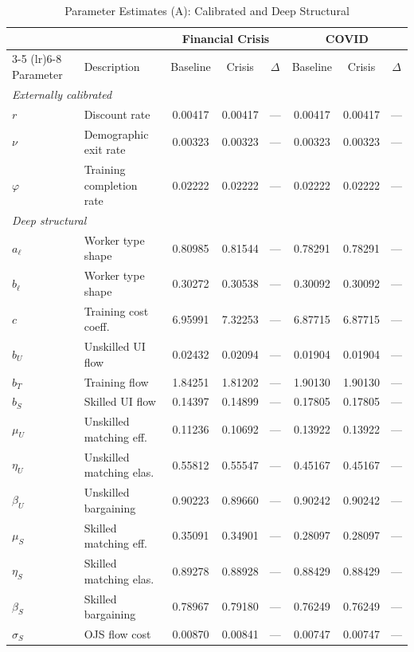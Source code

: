 \begin{table}[htbp]
  \centering
  \caption{Parameter Estimates (A): Calibrated and Deep Structural}
  \label{tab:param_estimates_a}
  \small
  \begin{tabular}{llcccccc}
    \toprule
    & & \multicolumn{3}{c}{Financial Crisis} & \multicolumn{3}{c}{COVID} \\
    \cmidrule(lr){3-5} \cmidrule(lr){6-8}
    Parameter & Description & Baseline & Crisis & $\Delta$ & Baseline & Crisis & $\Delta$ \\
    \midrule
    \multicolumn{8}{l}{\textit{Externally calibrated}} \\[2pt]
    \quad $r$ & Discount rate & 0.00417 & 0.00417 & --- & 0.00417 & 0.00417 & --- \\
    \quad $\nu$ & Demographic exit rate & 0.00323 & 0.00323 & --- & 0.00323 & 0.00323 & --- \\
    \quad $\varphi$ & Training completion rate & 0.02222 & 0.02222 & --- & 0.02222 & 0.02222 & --- \\
    [4pt]
    \hline
    \multicolumn{8}{l}{\textit{Deep structural}} \\[2pt]
    \quad $a_\ell$ & Worker type shape & 0.80985 & 0.81544 & --- & 0.78291 & 0.78291 & --- \\
    \quad $b_\ell$ & Worker type shape & 0.30272 & 0.30538 & --- & 0.30092 & 0.30092 & --- \\
    \quad $c$ & Training cost coeff. & 6.95991 & 7.32253 & --- & 6.87715 & 6.87715 & --- \\
    \quad $b_U$ & Unskilled UI flow & 0.02432 & 0.02094 & --- & 0.01904 & 0.01904 & --- \\
    \quad $b_T$ & Training flow & 1.84251 & 1.81202 & --- & 1.90130 & 1.90130 & --- \\
    \quad $b_S$ & Skilled UI flow & 0.14397 & 0.14899 & --- & 0.17805 & 0.17805 & --- \\
    \quad $\mu_U$ & Unskilled matching eff. & 0.11236 & 0.10692 & --- & 0.13922 & 0.13922 & --- \\
    \quad $\eta_U$ & Unskilled matching elas. & 0.55812 & 0.55547 & --- & 0.45167 & 0.45167 & --- \\
    \quad $\beta_U$ & Unskilled bargaining & 0.90223 & 0.89660 & --- & 0.90242 & 0.90242 & --- \\
    \quad $\mu_S$ & Skilled matching eff. & 0.35091 & 0.34901 & --- & 0.28097 & 0.28097 & --- \\
    \quad $\eta_S$ & Skilled matching elas. & 0.89278 & 0.88928 & --- & 0.88429 & 0.88429 & --- \\
    \quad $\beta_S$ & Skilled bargaining & 0.78967 & 0.79180 & --- & 0.76249 & 0.76249 & --- \\
    \quad $\sigma_S$ & OJS flow cost & 0.00870 & 0.00841 & --- & 0.00747 & 0.00747 & --- \\
    [4pt]
    \bottomrule
  \end{tabular}
\end{table}